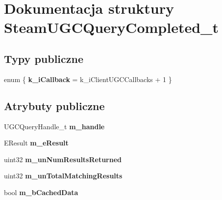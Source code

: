 \hypertarget{struct_steam_u_g_c_query_completed__t}{}\section{Dokumentacja struktury Steam\+U\+G\+C\+Query\+Completed\+\_\+t}
\label{struct_steam_u_g_c_query_completed__t}
\subsection*{Typy publiczne}
\begin{DoxyCompactItemize}
\item 
\mbox{\label{struct_steam_u_g_c_query_completed__t_a86845c8371d8d14bf2020207c81f5f62}} 
enum \{ {\bfseries k\+\_\+i\+Callback} = k\+\_\+i\+Client\+U\+G\+C\+Callbacks + 1
 \}
\end{DoxyCompactItemize}
\subsection*{Atrybuty publiczne}
\begin{DoxyCompactItemize}
\item 
\mbox{\label{struct_steam_u_g_c_query_completed__t_ac02f5c90496db60a67bcad09dccdfe13}} 
U\+G\+C\+Query\+Handle\+\_\+t {\bfseries m\+\_\+handle}
\item 
\mbox{\label{struct_steam_u_g_c_query_completed__t_a43819b9bf5dd770b0530509404b7d999}} 
E\+Result {\bfseries m\+\_\+e\+Result}
\item 
\mbox{\label{struct_steam_u_g_c_query_completed__t_aa47577ef419a0679f9fa2ad43896bc62}} 
uint32 {\bfseries m\+\_\+un\+Num\+Results\+Returned}
\item 
\mbox{\label{struct_steam_u_g_c_query_completed__t_a17da8fde1e0582013ce5602957afb7bf}} 
uint32 {\bfseries m\+\_\+un\+Total\+Matching\+Results}
\item 
\mbox{\label{struct_steam_u_g_c_query_completed__t_a034a7f44cc3e19bb58c8e8cce569a19a}} 
bool {\bfseries m\+\_\+b\+Cached\+Data}
\end{DoxyCompactItemize}



